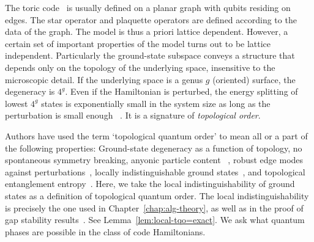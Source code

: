 
The toric code~\cite{Kitaev2003Fault-tolerant} 
is usually defined on a planar graph with qubits residing on edges.
The star operator and plaquette operators 
are defined according to the data of the graph.
The model is thus a priori lattice dependent.
However, a certain set of important properties of the model
turns out to be lattice independent.
Particularly the ground-state subspace 
conveys a structure that depends only on the topology of the underlying space, 
insensitive to the microscopic detail.
If the underlying space is a genus $g$ (oriented) surface,
the degeneracy is $4^g$.
Even if the Hamiltonian is perturbed,
the energy splitting of lowest $4^g$ states
is exponentially small in the system size
as long as the perturbation is small enough~%
\cite{WenNiu1990GroundState,
Kitaev2003Fault-tolerant,
BravyiHastingsMichalakis2010stability}.
It is a signature of \emph{topological order}.


Authors have used the term `topological quantum order' to mean
all or a part of the following properties:
Ground-state degeneracy as a function of topology,
no spontaneous symmetry breaking,
anyonic particle content~%
\cite{
WenWilczekZee1989Chiral,
Wen1989Degeneracy,
Einarsson1990Fractional,
WenNiu1990GroundState,
ReadSachdev1991LargeN,
Wen1991SpinLiquid},
robust edge modes against 
perturbations~\cite{KaneMele2005,FuKaneMele2007Topological,HasanKane2010TIReview},
locally indistinguishable ground states~\cite{
BravyiHastingsMichalakis2010stability,
BravyiHastings2011short,
MichalakisPytel2011stability},
and topological entanglement entropy~\cite{KitaevPreskill2006Topological,LevinWen2006Detecting}.
Here, we take the local indistinguishability of ground states
as a definition of topological quantum order.
The local indistinguishability is precisely the one used in Chapter~\ref{chap:alg-theory},
as well as in the proof of gap stability 
results~\cite{BravyiHastings2011short,
MichalakisPytel2011stability}.
See Lemma~\ref{lem:local-tqo=exact}.
We ask what quantum phases are possible in the class of code Hamiltonians.


